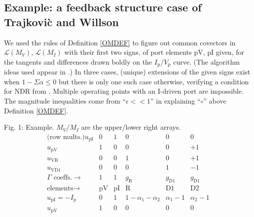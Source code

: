 \documentclass{article}
\begin{document}
\subsection{Example: a feedback structure case of 
Trajkovi\`{c} and Willson \cite{TrajWillNDR}}

We used the rules of 
Definition \ref{OMDEF} to figure out common covectors in 
$\mathcal{L}(M_V)$, $\mathcal{L}(M_I)$ with 
their first two 
signs,
of port elements pV, pI given,
for the 
tangents and differences drawn boldly on the 
$I_{\mbox{p}}$/$V_{\mbox{p}}$ curve.  
(The algorithm ideas used appear in \cite{sdcOMP}.)
In three cases, (unique)
extensions of the given signs exist when $1-\Sigma\alpha\le 0$ but there is
only one such case otherwise, verifying a condition for NDR from 
\cite{TrajWillNDR}.
Multiple operating points with an I-driven port are impossible.  
The magnitude inequalities come from ``$\epsilon<<1$'' in explaining
``$\circ$'' above Definition \ref{OMDEF}.

\noindent 
Fig. 1: Example.  
$M_V$/$M_I$ are the upper/lower right arrays.\hspace*{-20pt}
\[
\begin{array}{c|ccccc}
\mbox{(row mults.)}u_{\mbox{pI}}
                           & 0 & 1 & 0 & 0 & 0 \\
u_{\mbox{pV}}              & 1 & 0 & 0 & 0 & +1 \\
u_{\mbox{VR}}              & 0 & 0 & 1 & 0 & +1 \\
u_{\mbox{VD1}}             & 0 & 0 & 0 & 1 &-1 \\ \hline
\Gamma\mbox{\ coeffs.}\rightarrow
                           & 1 & 1 & g_{\mbox{R}}
                                       & g_{\mbox{D1}}
                                           & g_{\mbox{D1}} \\ \hline
\mbox{elements}\rightarrow & \mbox{pV}
                               & \mbox{pI}
                                   & \mbox{R} 
                                       & \mbox{D1}
                                           & \mbox{D2} \\ \hline
u_{\mbox{pI}}=-I_{\mbox{p}}& 0 & 1 
                                   & 1-\alpha_1-\alpha_2
                                       & \alpha_1-1
                                           &\alpha_2-1  \\
u_{\mbox{pV}}              & 1 & 0 & 0 & 0 & 0
\end{array}
\]

\noindent
\vspace*{0.5em}
\end{document}

